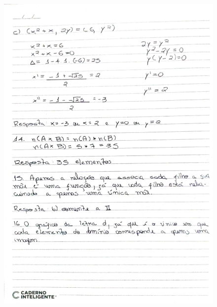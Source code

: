 \documentclass[
  12pt,     %
  openright,      %
  oneside,      %
  a4paper     %
  ]{abntex2}
\begin{document}
\begin{figure}[H]
  \centering
  \includegraphics[scale=0.23]{pagina8.jpg}
\end{figure}
\end{document}
